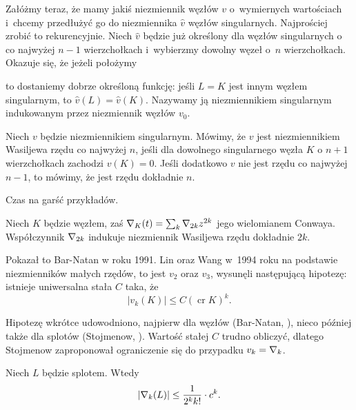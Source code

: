 Załóżmy teraz, że mamy jakiś niezmiennik węzłów $v$ o~wymiernych wartościach i~chcemy przedłużyć go do niezmiennika $\hat v$ węzłów singularnych.
Najprościej zrobić to rekurencyjnie.
Niech $\hat v$ będzie już określony dla węzłów singularnych o co najwyżej $n - 1$ wierzchołkach i~wybierzmy dowolny węzeł o~$n$ wierzchołkach.
Okazuje się, że jeżeli położymy
\begin{comment}
\begin{equation}
    \hat v(K) = \hat v(\LittleLeftCrossing) - \hat v(\LittleRightCrossing),
\end{equation}
\end{comment}
to dostaniemy dobrze określoną funkcję: jeśli $L = K$ jest innym węzłem singularnym, to $\hat v(L) = \hat v(K)$.
Nazywamy ją niezmiennikiem singularnym indukowanym przez niezmiennik węzłów $v_0$.

\begin{definition}
    \label{def:vassiliev_order}
    Niech $v$ będzie niezmiennikiem singularnym.
    Mówimy, że $v$ jest niezmiennikiem Wasiljewa rzędu co najwyżej $n$, jeśli dla dowolnego singularnego węzła $K$ o $n + 1$ wierzchołkach zachodzi $v(K) = 0$.
    Jeśli dodatkowo $v$ nie jest rzędu co najwyżej $n - 1$, to mówimy, że jest rzędu dokładnie $n$.
\end{definition}

Czas na garść przykładów.

\begin{example}
    Niech $K$ będzie węzłem, zaś $\nabla_K(t) = \sum_k \nabla_{2k} z^{2k}$ jego wielomianem Conwaya.
    Współczynnik $\nabla_{2k}$ indukuje niezmiennik Wasiljewa rzędu dokładnie $2k$.
\end{example}

Pokazał to Bar-Natan w roku 1991.
Lin oraz Wang w~1994 roku na podstawie niezmienników małych rzędów, to jest $v_2$ oraz $v_3$, wysunęli następującą hipotezę: istnieje uniwersalna stała $C$ taka, że
\begin{equation}
    |v_k(K)| \le C (\operatorname{cr} K)^k.
\end{equation}

Hipotezę wkrótce udowodniono, najpierw dla węzłów (Bar-Natan, \cite{barnatan95}), nieco później także dla splotów (Stojmenow, \cite{stoimenow_01}).
Wartość stałej $C$ trudno obliczyć, dlatego Stojmenow zaproponował ograniczenie się do przypadku $v_k = \nabla_k$.

\begin{conjecture}
    Niech $L$ będzie splotem.
    Wtedy
    \begin{equation}
        |\nabla_k(L)| \le \frac{1}{2^kk!} \cdot c^k.
    \end{equation}
\end{conjecture}


